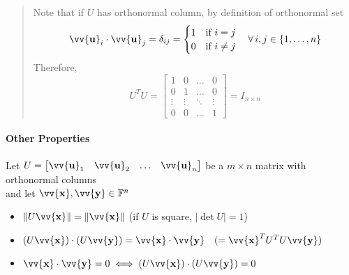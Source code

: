 \documentclass[11pt]{article}
\DeclareRobustCommand{\myvec}[1]{\vv{\mathbf{#1}}}
\newcommand{\mymat}[1]{#1}
\begin{document}
\begin{quote}
        Note that if $\mymat{U}$ has orthonormal column, by definition of orthonormal set
        \begin{equation*}
            \myvec{u}_i \cdot \myvec{u}_j = \delta_{ij} = \begin{cases}
                1 & \text{if } i = j \\
                0 & \text{if } i \ne j
            \end{cases} \quad \forall\,i, j \in \{1, \dots, n\}
        \end{equation*}
        Therefore,
        \begin{equation*}
            \mymat{U}^T\mymat{U} = \begin{bmatrix}
                1       & 0         & \dots     & 0 \\
                0       & 1         & \dots     & 0 \\
                \vdots  & \vdots    & \ddots    & \vdots \\
                0       & 0         & \dots     & 1 
            \end{bmatrix} = \mymat{I}_{n \times n}
        \end{equation*}
    \end{quote}

    \paragraph{Other Properties}\mbox{}\vspace{1ex}

    Let $\mymat{U} = \begin{bmatrix} \myvec{u}_1 & \myvec{u}_2 & \dots & \myvec{u}_n \end{bmatrix}$ be a $m \times n$ matrix with orthonormal columns \\
    and let $\myvec{x}, \myvec{y} \in \mathbb{F}^n$
    \begin{itemize}
        \item $\|\mymat{U}\myvec{x}\| = \|\myvec{x}\|$ \quad (if $\mymat{U}$ is square, $|\det \mymat{U}| = 1$)
        \item $(\mymat{U}\myvec{x}) \cdot (\mymat{U}\myvec{y}) = \myvec{x} \cdot \myvec{y} \quad (= \myvec{x}^T \mymat{U}^T \mymat{U} \myvec{y}) $
        \item $\myvec{x} \cdot \myvec{y} = 0 \iff (\mymat{U}\myvec{x}) \cdot (\mymat{U}\myvec{y}) = 0$            
    \end{itemize}
    
\end{document}
